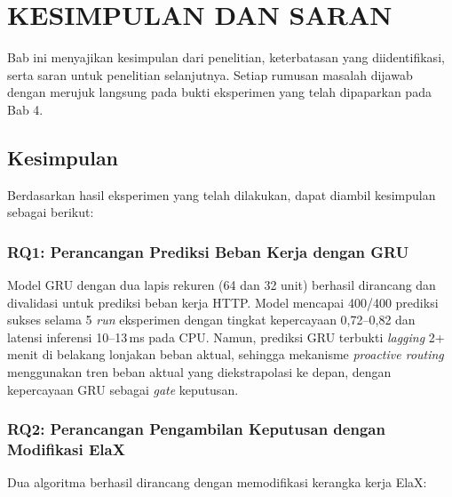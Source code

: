 
\chapter{KESIMPULAN DAN SARAN}
\label{sec:kesimpulan-dan-saran}

Bab ini menyajikan kesimpulan dari penelitian, keterbatasan yang diidentifikasi, serta saran untuk penelitian selanjutnya. Setiap rumusan masalah dijawab dengan merujuk langsung pada bukti eksperimen yang telah dipaparkan pada Bab 4.

\section{Kesimpulan}
\label{sec:kesimpulan}

Berdasarkan hasil eksperimen yang telah dilakukan, dapat diambil kesimpulan sebagai berikut:

\subsection{RQ1: Perancangan Prediksi Beban Kerja dengan GRU}

Model GRU dengan dua lapis rekuren (64 dan 32 unit) berhasil dirancang dan divalidasi untuk prediksi beban kerja HTTP. Model mencapai 400/400 prediksi sukses selama 5 \emph{run} eksperimen dengan tingkat kepercayaan 0,72--0,82 dan latensi inferensi 10--13\,ms pada CPU. Namun, prediksi GRU terbukti \emph{lagging} 2+ menit di belakang lonjakan beban aktual, sehingga mekanisme \emph{proactive routing} menggunakan tren beban aktual yang diekstrapolasi ke depan, dengan kepercayaan GRU sebagai \emph{gate} keputusan.

\subsection{RQ2: Perancangan Pengambilan Keputusan dengan Modifikasi ElaX}

Dua algoritma berhasil dirancang dengan memodifikasi kerangka kerja ElaX:

